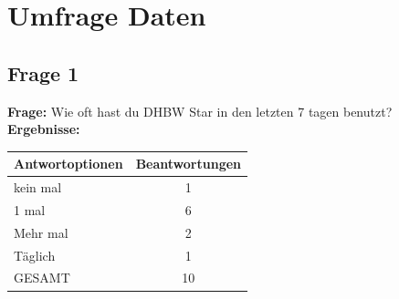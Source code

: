 \chapter{Umfrage Daten}
\section{Frage 1 \label{frage01}}
\begin{figure}
	\centering
\end{figure}
\textbf{Frage:} Wie oft hast du DHBW Star in den letzten 7 tagen benutzt?\\
\textbf{Ergebnisse:}\\
\begin{tabular}{|l|c|}\hline
	\textbf{Antwortoptionen} & \textbf{Beantwortungen} \\\hline
	kein mal & 1 \\\hline
	1 mal	 & 6 \\\hline
	Mehr mal & 2 \\\hline
	Täglich  & 1 \\\hline
	GESAMT	 & 10 \\\hline			
\end{tabular}



